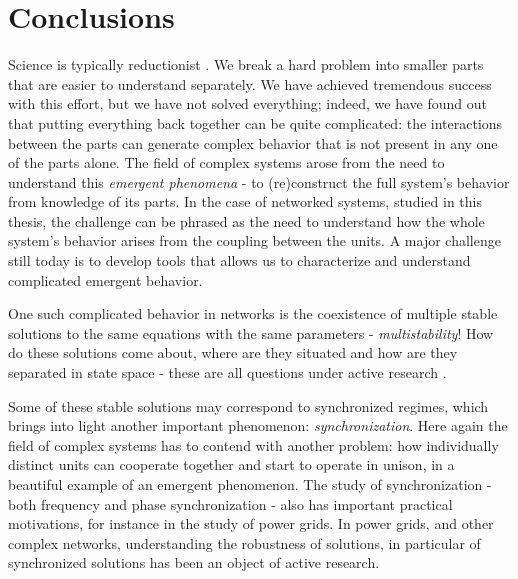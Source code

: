 \chapter{Conclusions}\label{chap:conclusions}

Science is typically reductionist \cite{strogatzsyncbook}. We break a hard problem into smaller parts that are easier to understand separately. We have achieved tremendous success with this effort, but we have not solved everything; indeed, we have found out that putting everything back together can be quite complicated: the interactions between the parts can generate complex behavior that is not present in any one of the parts alone.
The field of complex systems arose from the need to understand this \textit{emergent phenomena} - to (re)construct the full system's behavior from knowledge of its parts. In the case of networked systems, studied in this thesis, the challenge can be phrased as the need to understand how the whole system's behavior arises from the coupling between the units. A major challenge still today is to develop tools that allows us to characterize and understand complicated emergent behavior.

One such complicated behavior in networks is the coexistence of multiple stable solutions to the same equations with the same parameters - \textit{multistability}! How do these solutions come about, where are they situated and how are they separated in state space - these are all questions under active research \cite{feudel2008complex, pisarchik2022multistability, zhang2021basins}. 

Some of these stable solutions may correspond to synchronized regimes, which brings into light another important phenomenon: \textit{synchronization}. Here again the field of complex systems has to contend with another problem: how individually distinct units can cooperate together and start to operate in unison, in a beautiful example of an emergent phenomenon. The study of synchronization - both frequency and phase synchronization - also has important practical motivations, for instance in the study of power grids. In power grids, and other complex networks, understanding the robustness of solutions, in particular of synchronized solutions has been an object of active research. 

